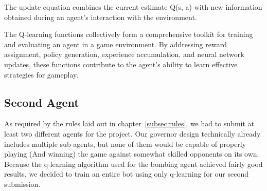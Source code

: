The update equation combines the current estimate Q(s, a) with new information obtained during an agent's interaction with the environment.

The Q-learning functions collectively form a comprehensive toolkit for training and evaluating an agent in a game environment. By addressing reward assignment, policy generation, experience accumulation, and neural network updates, these functions contribute to the agent's ability to learn effective strategies for gameplay.

\subsection{Second Agent}
\label{subsec:second-design}
As required by the rules laid out in chapter~\ref{subsec:rules}, we had to submit at least two different agents for the
project.
Our governor design technically already includes multiple sub-agents, but none of them would be capable of properly
playing (And winning) the game against somewhat skilled opponents on its own.
Because the q-learning algorithm used for the bombing agent achieved fairly good results, we decided to train an entire
bot using only q-learning for our second submission.
